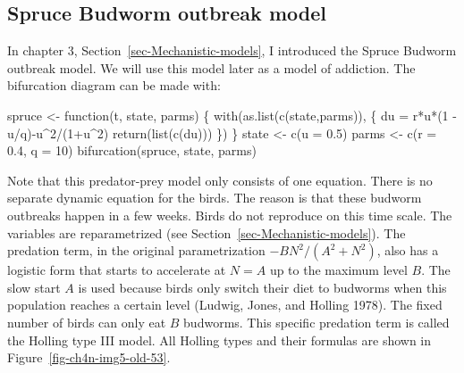 \documentclass[
  a4paper,
  DIV=11,
  numbers=noendperiod,
  oneside]{scrreprt}
\newenvironment{Shaded}{\begin{snugshade}}{\end{snugshade}}
\newcommand{\AttributeTok}[1]{\textcolor[rgb]{0.40,0.45,0.13}{#1}}
\newcommand{\ControlFlowTok}[1]{\textcolor[rgb]{0.00,0.23,0.31}{#1}}
\newcommand{\DecValTok}[1]{\textcolor[rgb]{0.68,0.00,0.00}{#1}}
\newcommand{\FloatTok}[1]{\textcolor[rgb]{0.68,0.00,0.00}{#1}}
\newcommand{\FunctionTok}[1]{\textcolor[rgb]{0.28,0.35,0.67}{#1}}
\newcommand{\NormalTok}[1]{\textcolor[rgb]{0.00,0.23,0.31}{#1}}
\newcommand{\OtherTok}[1]{\textcolor[rgb]{0.00,0.23,0.31}{#1}}
\newcommand{\SpecialCharTok}[1]{\textcolor[rgb]{0.37,0.37,0.37}{#1}}
\begin{document}
\hypertarget{sec-Spruce-Budworm-outbreak-model}{%
\subsection{Spruce Budworm outbreak
model}\label{sec-Spruce-Budworm-outbreak-model}}

In chapter 3, Section~\ref{sec-Mechanistic-models}, I introduced the
Spruce Budworm outbreak model. We will use this model later as a model
of addiction. The bifurcation diagram can be made with:

\begin{Shaded}
\begin{Highlighting}[]
\NormalTok{spruce }\OtherTok{\textless{}{-}} \ControlFlowTok{function}\NormalTok{(t, state, parms) \{}
  \FunctionTok{with}\NormalTok{(}\FunctionTok{as.list}\NormalTok{(}\FunctionTok{c}\NormalTok{(state,parms)), \{}
\NormalTok{    du }\OtherTok{=}\NormalTok{ r}\SpecialCharTok{*}\NormalTok{u}\SpecialCharTok{*}\NormalTok{(}\DecValTok{1} \SpecialCharTok{{-}}\NormalTok{ u}\SpecialCharTok{/}\NormalTok{q)}\SpecialCharTok{{-}}\NormalTok{u}\SpecialCharTok{\^{}}\DecValTok{2}\SpecialCharTok{/}\NormalTok{(}\DecValTok{1}\SpecialCharTok{+}\NormalTok{u}\SpecialCharTok{\^{}}\DecValTok{2}\NormalTok{)}
    \FunctionTok{return}\NormalTok{(}\FunctionTok{list}\NormalTok{(}\FunctionTok{c}\NormalTok{(du)))}
\NormalTok{  \})}
\NormalTok{\}}
\NormalTok{state }\OtherTok{\textless{}{-}} \FunctionTok{c}\NormalTok{(}\AttributeTok{u =} \FloatTok{0.5}\NormalTok{)}
\NormalTok{parms }\OtherTok{\textless{}{-}} \FunctionTok{c}\NormalTok{(}\AttributeTok{r =} \FloatTok{0.4}\NormalTok{, }\AttributeTok{q =} \DecValTok{10}\NormalTok{)}
\FunctionTok{bifurcation}\NormalTok{(spruce, state, parms)}
\end{Highlighting}
\end{Shaded}

Note that this predator-prey model only consists of one equation. There
is no separate dynamic equation for the birds. The reason is that these
budworm outbreaks happen in a few weeks. Birds do not reproduce on this
time scale. The variables are reparametrized (see
Section~\ref{sec-Mechanistic-models}). The predation term, in the
original parametrization \(- BN^{2}/(A^{2} + N^{2})\), also has a
logistic form that starts to accelerate at \(N = A\) up to the maximum
level \(B\). The slow start \(A\) is used because birds only switch
their diet to budworms when this population reaches a certain level
(Ludwig, Jones, and Holling 1978). The fixed number of birds can only
eat \(B\) budworms. This specific predation term is called the Holling
type III model. All Holling types and their formulas are shown in
Figure~\ref{fig-ch4n-img5-old-53}.
\end{document}
